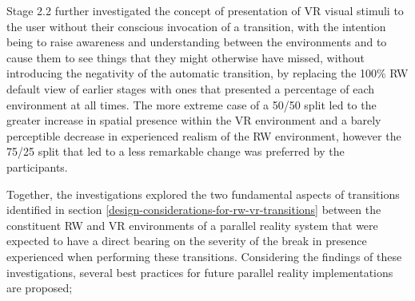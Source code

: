 Stage 2.2 further investigated the concept of presentation of VR visual stimuli to the user without their conscious invocation of a transition, with the intention being to raise awareness and understanding between the environments and to cause them to see things that they might otherwise have missed, without introducing the negativity of the automatic transition, by replacing the 100\% RW default view of earlier stages with ones that presented a percentage of each environment at all times. The more extreme case of a 50/50 split led to the greater increase in spatial presence within the VR environment and a barely perceptible decrease in experienced realism of the RW environment, however the 75/25 split that led to a less remarkable change was preferred by the participants.

Together, the investigations explored the two fundamental aspects of transitions identified in section \ref{design-considerations-for-rw-vr-transitions} between the constituent RW and VR environments of a parallel reality system that were expected to have a direct bearing on the severity of the break in presence experienced when performing these transitions. Considering the findings of these investigations, several best practices for future parallel reality implementations are proposed;

